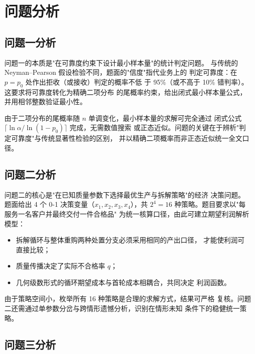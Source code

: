 \documentclass[withoutpreface,bwprint]{cumcmthesis}
\begin{document}
\newpage

\section{问题分析}

\subsection{问题一分析}

问题一的本质是"在可靠度约束下设计最小样本量"的统计判定问题。
与传统的 Neyman--Pearson 假设检验不同，题面的"信度"指代业务上的
判定可靠度：在 $p = p_0$ 处作出拒收（或接收）判定的概率不低
于 95\%（或不高于 10\% 错判率）。这要求将可靠度转化为精确二项分布
的尾概率约束，给出闭式最小样本量公式，并用相邻整数验证最小性。

由于二项分布的尾概率随 $n$ 单调变化，最小样本量的求解可完全通过
闭式公式 $\lceil \ln \alpha / \ln(1 - p_0) \rceil$ 完成，无需数值搜索
或正态近似。问题的关键在于辨析"判定可靠度"与传统显著性检验的区别，
并以精确二项概率而非正态近似统一全文口径。

\subsection{问题二分析}

问题二的核心是"在已知质量参数下选择最优生产与拆解策略"的经济
决策问题。题面给出 4 个 0-1 决策变量（$x_1, x_2, x_3, x_4$），共
$2^4 = 16$ 种策略。题目要求以"每服务一名客户并最终交付一件合格品"
为统一核算口径，由此可建立期望利润解析模型：

\begin{itemize}
    \item 拆解循环与整体重购两种处置分支必须采用相同的产出口径，
    才能使利润可直接比较；
    \item 质量传播决定了实际不合格率 $q$；
    \item 几何级数形式的循环期望成本与首轮成本相耦合，共同决定
    利润函数。
\end{itemize}

由于策略空间小，枚举所有 16 种策略是合理的求解方式，结果可严格
复核。问题二还需通过单参数分岔与跨情形遗憾分析，识别在情形未知
条件下的稳健统一策略。

\subsection{问题三分析}
\end{document}
